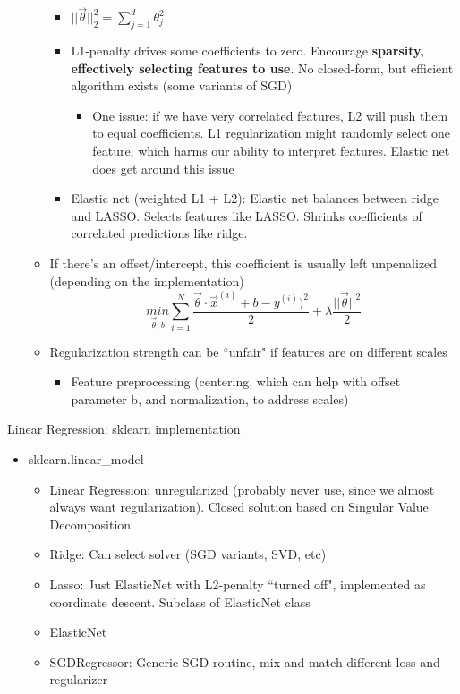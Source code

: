 \documentclass[10pt, oneside]{article}
\begin{document}
\begin{itemize}
\begin{itemize}
\begin{itemize}
            \item $||\vec \theta||_2 ^2 = \sum_{j=1} ^ d \theta _j ^ 2$
            \item L1-penalty drives some coefficients to zero. Encourage \textbf{sparsity, effectively selecting features to use}. No closed-form, but efficient algorithm exists (some variants of SGD)
            \begin{itemize}
                \item One issue: if we have very correlated features, L2 will push them to equal coefficients. L1 regularization might randomly select one feature, which harms our ability to interpret features. Elastic net does get around this issue
            \end{itemize}
            \item Elastic net (weighted L1 + L2): Elastic net balances between ridge and LASSO. Selects features like LASSO. Shrinks coefficients of correlated predictions like ridge.
        \end{itemize}
        \item If there's an offset/intercept, this coefficient is usually left unpenalized (depending on the implementation)
        $$\underset{\vec \theta,b}{min}\sum_{i=1} ^N \frac{\vec \theta \cdot \vec x^{(i)} + b - y^{(i)})^2}{2} + \lambda \frac{||\vec \theta||^2}{2}$$
        \item Regularization strength can be ``unfair" if features are on different scales
        \begin{itemize}
            \item Feature preprocessing (centering, which can help with offset parameter b, and normalization, to address scales)
        \end{itemize}
    \end{itemize}
\end{itemize}
Linear Regression: sklearn implementation
\begin{itemize}
    \item sklearn.linear\_model
    \begin{itemize}
        \item Linear Regression: unregularized (probably never use, since we almost always want regularization). Closed solution based on Singular Value Decomposition
        \item Ridge: Can select solver (SGD variants, SVD, etc)
        \item Lasso: Just ElasticNet with L2-penalty ``turned off", implemented as coordinate descent. Subclass of ElasticNet class
        \item ElasticNet
        \item SGDRegressor: Generic SGD routine, mix and match different loss and regularizer
    \end{itemize}
\end{itemize}
\end{document}
